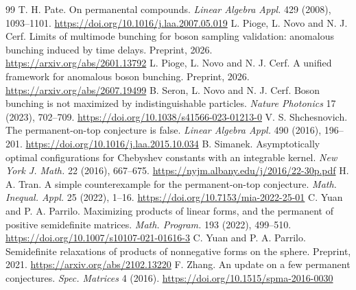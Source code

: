 \documentclass[11pt,a4paper]{article}
\theoremstyle{remark}
\begin{document}
\begin{thebibliography}{99}
 T. H. Pate. On permanental compounds. \emph{Linear Algebra Appl.} 429 (2008), 1093--1101. \url{https://doi.org/10.1016/j.laa.2007.05.019}
 L. Pioge, L. Novo and N. J. Cerf. Limits of multimode bunching for boson sampling validation: anomalous bunching induced by time delays. Preprint, 2026. \url{https://arxiv.org/abs/2601.13792}
 L. Pioge, L. Novo and N. J. Cerf. A unified framework for anomalous boson bunching. Preprint, 2026. \url{https://arxiv.org/abs/2607.19499}
 B. Seron, L. Novo and N. J. Cerf. Boson bunching is not maximized by indistinguishable particles. \emph{Nature Photonics} 17 (2023), 702--709. \url{https://doi.org/10.1038/s41566-023-01213-0}
 V. S. Shchesnovich. The permanent-on-top conjecture is false. \emph{Linear Algebra Appl.} 490 (2016), 196--201. \url{https://doi.org/10.1016/j.laa.2015.10.034}
 B. Simanek. Asymptotically optimal configurations for Chebyshev constants with an integrable kernel. \emph{New York J. Math.} 22 (2016), 667--675. \url{https://nyjm.albany.edu/j/2016/22-30p.pdf}
 H. A. Tran. A simple counterexample for the permanent-on-top conjecture. \emph{Math. Inequal. Appl.} 25 (2022), 1--16. \url{https://doi.org/10.7153/mia-2022-25-01}
 C. Yuan and P. A. Parrilo. Maximizing products of linear forms, and the permanent of positive semidefinite matrices. \emph{Math. Program.} 193 (2022), 499--510. \url{https://doi.org/10.1007/s10107-021-01616-3}
 C. Yuan and P. A. Parrilo. Semidefinite relaxations of products of nonnegative forms on the sphere. Preprint, 2021. \url{https://arxiv.org/abs/2102.13220}
 F. Zhang. An update on a few permanent conjectures. \emph{Spec. Matrices} 4 (2016). \url{https://doi.org/10.1515/spma-2016-0030}
\end{thebibliography}
\end{document}
